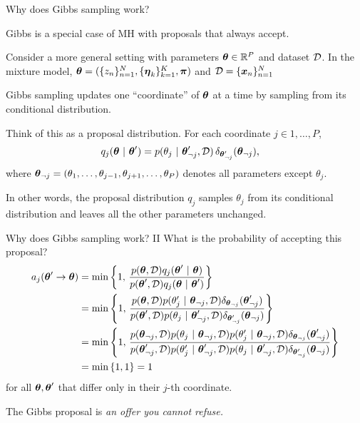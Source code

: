 \documentclass[aspectratio=169]{beamer}
\begin{document}
\begin{frame}{Why does Gibbs sampling work?}

Gibbs is a special case of MH with proposals that always accept.

Consider a more general setting with parameters $\boldsymbol{\theta} \in \mathbb{R}^P$ and dataset $\mathcal{D}$. In the mixture model, $\boldsymbol{\theta} = (\{z_n\}_{n=1}^N, \{\boldsymbol{\eta}_k\}_{k=1}^K, \boldsymbol{\pi})$ and $\mathcal{D} = \{\boldsymbol{x}_n\}_{n=1}^N$ 

Gibbs sampling updates one ``coordinate'' of $\boldsymbol{\theta}$ at a time by sampling from its conditional distribution. 

Think of this as a proposal distribution. For each coordinate $j \in 1,\ldots,P$, 
\begin{align}
    q_j(\boldsymbol{\theta} ~\vert~ \boldsymbol{\theta}') &= p(\theta_j ~\vert~ \boldsymbol{\theta}'_{\neg j}, \mathcal{D}) \, \delta_{\boldsymbol{\theta}'_{\neg j}}(\boldsymbol{\theta}_{\neg j}), 
\end{align}
where $\boldsymbol{\theta}_{\neg j} = (\theta_1, \ldots, \theta_{j-1}, \theta_{j+1}, \ldots, \theta_P)$ denotes all parameters except $\theta_j$.

In other words, the proposal distribution $q_j$ samples $\theta_j$ from its conditional distribution and leaves all the other parameters unchanged.

\end{frame}

\begin{frame}{Why does Gibbs sampling work? II}
What is the probability of accepting this proposal?
\begin{align}
    a_j(\boldsymbol{\theta}' \to \boldsymbol{\theta}) 
    &= \min \left\{ 1, \, \frac{p(\boldsymbol{\theta}, \mathcal{D}) q_j(\boldsymbol{\theta}' ~\vert~ \boldsymbol{\theta})}{p(\boldsymbol{\theta}', \mathcal{D}) q_j(\boldsymbol{\theta} ~\vert~ \boldsymbol{\theta}')} \right\} \\
    &= \min \left\{ 1, \, \frac{p(\boldsymbol{\theta}, \mathcal{D}) p(\theta_j' ~\vert~ \boldsymbol{\theta}_{\neg j}, \mathcal{D}) \delta_{\boldsymbol{\theta}_{\neg j}}(\boldsymbol{\theta}'_{\neg j})}{p(\boldsymbol{\theta}', \mathcal{D}) p(\theta_j ~\vert~ \boldsymbol{\theta}'_{\neg j}, \mathcal{D}) \delta_{\boldsymbol{\theta}'_{\neg j}}(\boldsymbol{\theta}_{\neg j})} \right\} \\
    &= \min \left\{ 1, \, \frac{p(\boldsymbol{\theta}_{\neg j}, \mathcal{D}) p(\theta_j ~\vert~ \boldsymbol{\theta}_{\neg j}, \mathcal{D}) p(\theta_j' ~\vert~ \boldsymbol{\theta}_{\neg j}, \mathcal{D}) \delta_{\boldsymbol{\theta}_{\neg j}}(\boldsymbol{\theta}'_{\neg j})}{p(\boldsymbol{\theta}'_{\neg j}, \mathcal{D}) p(\theta'_j ~\vert~ \boldsymbol{\theta}'_{\neg j}, \mathcal{D}) p(\theta_j ~\vert~ \boldsymbol{\theta}'_{\neg j}, \mathcal{D}) \delta_{\boldsymbol{\theta}'_{\neg j}}(\boldsymbol{\theta}_{\neg j})} \right\} \\
    &= \min \left\{1, 1 \right\} = 1
\end{align}
for all $\boldsymbol{\theta}, \boldsymbol{\theta}'$ that differ only in their $j$-th coordinate.

The Gibbs proposal is \textit{an offer you cannot refuse.} 
\end{frame}
\end{document}
